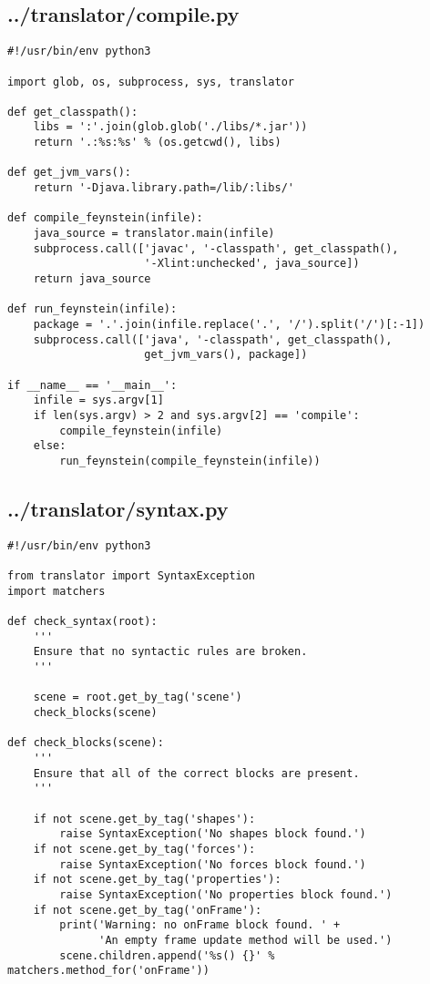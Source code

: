 \subsection*{../translator/compile.py}
\begin{lstlisting}
#!/usr/bin/env python3

import glob, os, subprocess, sys, translator

def get_classpath():
    libs = ':'.join(glob.glob('./libs/*.jar'))
    return '.:%s:%s' % (os.getcwd(), libs)

def get_jvm_vars():
    return '-Djava.library.path=/lib/:libs/'

def compile_feynstein(infile):
    java_source = translator.main(infile)
    subprocess.call(['javac', '-classpath', get_classpath(), 
                     '-Xlint:unchecked', java_source])
    return java_source

def run_feynstein(infile):
    package = '.'.join(infile.replace('.', '/').split('/')[:-1])
    subprocess.call(['java', '-classpath', get_classpath(), 
                     get_jvm_vars(), package])

if __name__ == '__main__':
    infile = sys.argv[1]
    if len(sys.argv) > 2 and sys.argv[2] == 'compile':
        compile_feynstein(infile)
    else:
        run_feynstein(compile_feynstein(infile))
\end{lstlisting}

\subsection*{../translator/syntax.py}
\begin{lstlisting}
#!/usr/bin/env python3

from translator import SyntaxException
import matchers

def check_syntax(root):
    '''
    Ensure that no syntactic rules are broken.
    '''

    scene = root.get_by_tag('scene')
    check_blocks(scene)

def check_blocks(scene):
    '''
    Ensure that all of the correct blocks are present.
    '''

    if not scene.get_by_tag('shapes'):
        raise SyntaxException('No shapes block found.')
    if not scene.get_by_tag('forces'):
        raise SyntaxException('No forces block found.')
    if not scene.get_by_tag('properties'):
        raise SyntaxException('No properties block found.')
    if not scene.get_by_tag('onFrame'):
        print('Warning: no onFrame block found. ' +
              'An empty frame update method will be used.')
        scene.children.append('%s() {}' % matchers.method_for('onFrame'))
\end{lstlisting}

